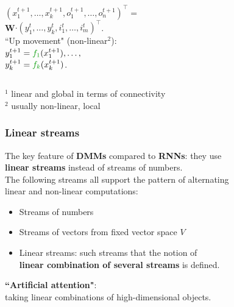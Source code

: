 \documentclass{beamer}
\newcommand{\msblue}[1]{{\color{myblue} #1}}
\newcommand{\msmagenta}[1]{{\color{mymagenta} #1}}
\newcommand{\msgreen}[1]{{\color{mygreen} #1}}
\begin{document}
\begin{frame}
\begin{columns}[T]
\begin{column}{0.5\textwidth}
$(x_1^{t+1}, \ldots, x_k^{t+1}, o_1^{t+1}, \ldots, o_n^{t+1})^{\top}=$\\[0.1ex] \msblue{{\bf W}}$ \cdot (y_1^{t}, \ldots, y_k^{t}, i_1^{t}, \ldots, i_m^{t})^{\top}$.\\[3ex]

``Up movement" \msgreen{(non-linear$^2$)}:\\[2ex]  

$y_1^{t+1} = \msgreen{f_1}(x_1^{t+1}), \ldots,$\\[0.1ex]$y_k^{t+1} = \msgreen{f_k}(x_k^{t+1})$.

\end{column}
\end{columns}

\hrulefill

\msblue{\footnotesize $^1$ linear and global in terms of connectivity}\\
\msgreen{\footnotesize $^2$ usually non-linear, local}

\end{frame}


\begin{frame}

\frametitle{\msmagenta{Linear streams}}

The key feature of {\bf DMMs} compared to {\bf RNNs}:
         they use\\ {\bf linear streams} instead of streams of numbers.\\[2ex]

The following streams all support the pattern of alternating\\ linear and non-linear computations:\\[2ex]

\begin{itemize}

\item Streams of numbers\\[2ex]

\item Streams of vectors from fixed vector space $V$\\[2ex]

\item Linear streams: such streams that the notion of\\ {\bf linear combination of several streams} is defined.\\[3ex]

\end{itemize}

\msmagenta{{\bf ``Artificial attention"}:\\ taking linear combinations of high-dimensional objects.}






\end{frame}
\end{document}
